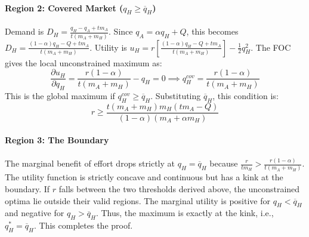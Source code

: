 \paragraph{Region 2: Covered Market ($q_H \ge \overline{q}_H$)}
Demand is $D_H = \frac{q_H - q_A + t m_A}{t(m_A + m_H)}$. Since $q_A = \alpha q_H + Q$, this becomes $D_H = \frac{(1-\alpha)q_H - Q + t m_A}{t(m_A + m_H)}$. Utility is $u_H = r\left[\frac{(1-\alpha)q_H - Q + t m_A}{t(m_A + m_H)}\right] - \frac{1}{2}q_H^2$. The FOC gives the local unconstrained maximum as:
\begin{equation*}
    \frac{\partial u_H}{\partial q_H} = \frac{r(1-\alpha)}{t(m_A + m_H)} - q_H = 0 \implies q_H^{cov} = \frac{r(1-\alpha)}{t(m_A + m_H)}
\end{equation*}
This is the global maximum if $q_H^{cov} \ge \overline{q}_H$. Substituting $\overline{q}_H$, this condition is:
\begin{equation*}
    r \ge \frac{t(m_A + m_H)m_H(t m_A - Q)}{(1-\alpha)(m_A + \alpha m_H)}
\end{equation*}

\paragraph{Region 3: The Boundary}
The marginal benefit of effort drops strictly at $q_H = \overline{q}_H$ because $\frac{r}{t m_H} > \frac{r(1-\alpha)}{t(m_A + m_H)}$. The utility function is strictly concave and continuous but has a kink at the boundary. If $r$ falls between the two thresholds derived above, the unconstrained optima lie outside their valid regions. The marginal utility is positive for $q_H < \overline{q}_H$ and negative for $q_H > \overline{q}_H$. Thus, the maximum is exactly at the kink, i.e., $q_H^* = \overline{q}_H$. This completes the proof. 





